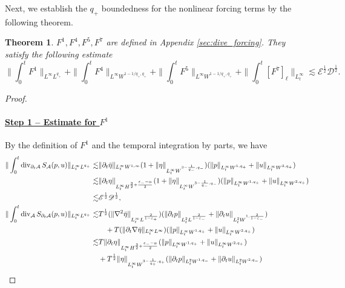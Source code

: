 \documentclass[letterpaper,reqno,10pt,twoside]{amsart}
\newtheorem{theorem}{Theorem}[section]
\theoremstyle{definition}
\theoremstyle{remark}
\def\p{\partial}
\def\dive{\mathop{\rm div}\nolimits}
\begin{document}
		Next, we establish the $q_{+}$ boundedness for the nonlinear forcing terms by the following theorem.
		\begin{theorem}{\label{thm:forcing_+}}
			$F^{1},F^{4},F^{5},F^{7}$ are defined in Appendix \ref{sec:dive_forcing}. They satisfy the following estimate
			\[
			\|\int_{0}^{t}F^1\|_{L^\infty 
				L^{q_+}} + \|\int_{0}^{t}F^4\|_{L^\infty W^{1-1/q_+,q_+}} + \|\int_{0}^{t}F^5\|_{L^\infty W^{1-1/q_+,q_+}} + \|\int_{0}^{t}[F^7]_\ell\|_{L_t^{\infty}}\lesssim \mathscr{E}^{\frac{1}{2}}\mathscr{D}^{\frac{1}{2}}.
			\]
		\end{theorem}
		\begin{proof}
			\ 
			\paragraph{\underline{Step 1 -- Estimate for $F^{1}$}} 
			By the definition of $F^{1}$ and the temporal integration by parts, we have
			\[
			\begin{aligned}
				\|\int_{0}^{t}\dive_{\p_{t}\mathcal{A}}S_{\mathcal{A}}(p,u)\|_{L_{t}^{\infty}L^{q_{+}}}\lesssim &\|\p_{t}\bar{\eta}\|_{L_{t}^{\infty}W^{1,\infty}}(1+\|\eta\|_{L_{t}^{\infty}W^{3-\frac{1}{q_{-}},q_{-}}})(\|p\|_{L_{t}^{\infty}W^{1,q_{+}}}+\|u\|_{L_{t}^{\infty}W^{2,q_{+}}})\\
				\lesssim&\|\p_{t}{\eta}\|_{L_{t}^{\infty}H^{\frac{3}{2}+\frac{\varepsilon_{-}-\alpha}{2}}}(1+\|\eta\|_{L_{t}^{\infty}W^{3-\frac{1}{q_{-}},q_{-}}})(\|p\|_{L_{t}^{\infty}W^{1,q_{+}}}+\|u\|_{L_{t}^{\infty}W^{2,q_{+}}})\\
				\lesssim&\mathscr{E}^{\frac{1}{2}}\mathscr{D}^{\frac{1}{2}},\\
				\|\int_{0}^{t}\dive_{\mathcal{A}}S_{\p_{t}\mathcal{A}}(p,u)\|_{L_{t}^{\infty}L^{q_{+}}}\lesssim &T^{\frac{1}{2}}(\|\nabla^{2}\bar{\eta}\|_{L_{t}^{\infty}L^{\frac{2}{1-\varepsilon_{+}}}})(\|\p_{t}p\|_{L_{t}^{2}L^{\frac{2}{1-\varepsilon_{-}}}}+\|\p_{t}u\|_{L_{t}^{2}W^{1,\frac{2}{1-\varepsilon_{-}}}})\\
				&\quad+T(\|\p_{t}\nabla\bar{\eta}\|_{L_{t}^{\infty}L^{\infty}})(\|p\|_{L_{t}^{\infty}W^{1,q_{+}}}+\|u\|_{L_{t}^{\infty}W^{2,q_{+}}})\\
				\lesssim&T\|\p_{t}{\eta}\|_{L_{t}^{\infty}H^{\frac{3}{2}+\frac{\varepsilon_{-}-\alpha}{2}}}(\|p\|_{L_{t}^{\infty}W^{1,q_{+}}}+\|u\|_{L_{t}^{\infty}W^{2,q_{+}}})\\
				&+T^{\frac{1}{2}}\|\eta\|_{L_{t}^{\infty}W^{3-\frac{1}{q_{+}},q_{+}}}(\|\p_{t}p\|_{L_{t}^{2}W^{1,q_{-}}}+\|\p_{t}u\|_{L_{t}^{2}W^{2,q_{-}}})

\end{aligned}\]
\end{proof}
\end{document}
